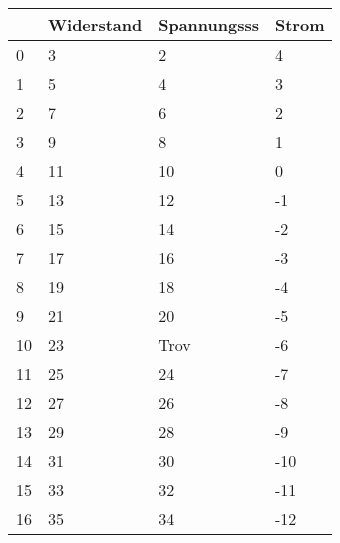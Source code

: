 \begin{tabular}{llll}
\toprule
{} & Widerstand & Spannungsss & Strom \\
\midrule
0  &          3 &           2 &     4 \\
1  &          5 &           4 &     3 \\
2  &          7 &           6 &     2 \\
3  &          9 &           8 &     1 \\
4  &         11 &          10 &     0 \\
5  &         13 &          12 &    -1 \\
6  &         15 &          14 &    -2 \\
7  &         17 &          16 &    -3 \\
8  &         19 &          18 &    -4 \\
9  &         21 &          20 &    -5 \\
10 &         23 &        Trov &    -6 \\
11 &         25 &          24 &    -7 \\
12 &         27 &          26 &    -8 \\
13 &         29 &          28 &    -9 \\
14 &         31 &          30 &   -10 \\
15 &         33 &          32 &   -11 \\
16 &         35 &          34 &   -12 \\
\bottomrule
\end{tabular}
